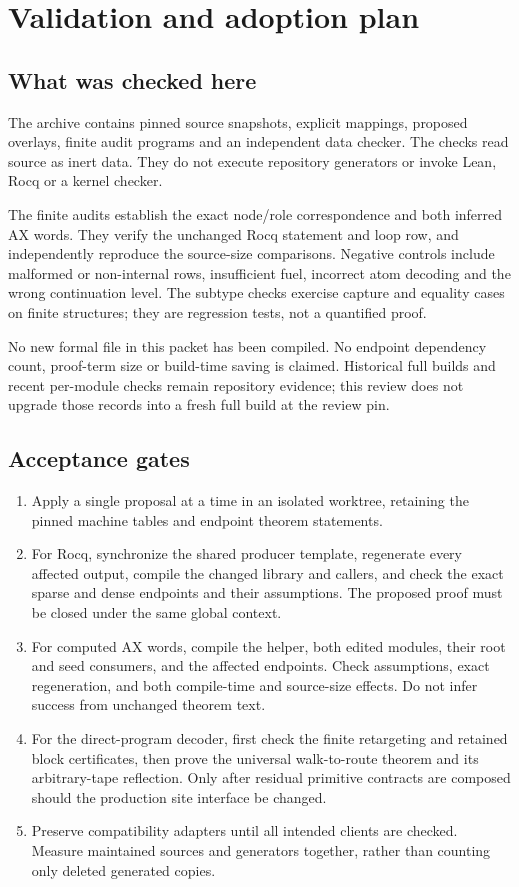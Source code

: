 \documentclass[11pt]{article}
\begin{document}
\section{Validation and adoption plan}
\subsection{What was checked here}
The archive contains pinned source snapshots, explicit mappings, proposed overlays, finite audit programs and an independent data checker. The checks read source as inert data. They do not execute repository generators or invoke Lean, Rocq or a kernel checker.

The finite audits establish the exact node/role correspondence and both inferred AX words. They verify the unchanged Rocq statement and loop row, and independently reproduce the source-size comparisons. Negative controls include malformed or non-internal rows, insufficient fuel, incorrect atom decoding and the wrong continuation level. The subtype checks exercise capture and equality cases on finite structures; they are regression tests, not a quantified proof.

No new formal file in this packet has been compiled. No endpoint dependency count, proof-term size or build-time saving is claimed. Historical full builds and recent per-module checks remain repository evidence; this review does not upgrade those records into a fresh full build at the review pin.

\subsection{Acceptance gates}
\begin{enumerate}
\item Apply a single proposal at a time in an isolated worktree, retaining the pinned machine tables and endpoint theorem statements.
\item For Rocq, synchronize the shared producer template, regenerate every affected output, compile the changed library and callers, and check the exact sparse and dense endpoints and their assumptions. The proposed proof must be closed under the same global context.
\item For computed AX words, compile the helper, both edited modules, their root and seed consumers, and the affected endpoints. Check assumptions, exact regeneration, and both compile-time and source-size effects. Do not infer success from unchanged theorem text.
\item For the direct-program decoder, first check the finite retargeting and retained block certificates, then prove the universal walk-to-route theorem and its arbitrary-tape reflection. Only after residual primitive contracts are composed should the production site interface be changed.
\item Preserve compatibility adapters until all intended clients are checked. Measure maintained sources and generators together, rather than counting only deleted generated copies.
\end{enumerate}
\end{document}
